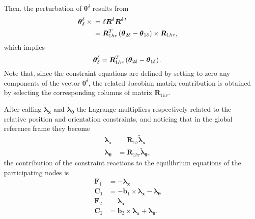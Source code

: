 \documentclass[10pt,dvips,fleqn]{report}
\newcommand{\T}[1]{\boldsymbol{#1}}
\begin{document}
Then, the perturbation of $\T{\theta}^{\delta}$ results from
\begin{align}
	\T{\theta}^{\delta}_{\delta} \times{}
	&= \delta\T{R}^{\delta} \T{R}^{\delta T} \\
	&= \T{R}_{1hr}^T \plbr{
		\T{\theta}_{2\delta} - \T{\theta}_{1\delta}
	} \times \T{R}_{1hr} ,
\end{align}
which implies
\begin{equation}
	\T{\theta}^{\delta}_{\delta} = \T{R}_{1hr}^T \plbr{
		\T{\theta}_{2\delta} - \T{\theta}_{1\delta}
	} .
\end{equation}
Note that, since the constraint equations are defined by setting 
to zero any components of the vector $\T{\theta}^{\delta}$, the
related Jacobian matrix contribution is obtained by selecting 
the corresponding columns of matrix $\T{R}_{1hr}$.


After calling $\tilde{\T{\lambda}}_{\T{x}}$
and $\tilde{\T{\lambda}}_{\T{\theta}}$ the Lagrange multipliers
respectively related to the relative position and orientation
constraints, and noticing that in the global reference frame
they become
\begin{align}
	\T{\lambda}_{\T{x}} &= \T{R}_{1h} \tilde{\T{\lambda}}_{\T{x}} \\
	\T{\lambda}_{\T{\theta}} &= \T{R}_{1hr} \tilde{\T{\lambda}}_{\T{\theta}} ,
\end{align}
the contribution of the constraint reactions to the equilibrium equations
of the participating nodes is
\begin{align}
	\T{F}_1 &= - \T{\lambda}_{\T{x}} \\
	\T{C}_1 &= - \T{b}_1 \times \T{\lambda}_{\T{x}} - \T{\lambda}_{\T{\theta}} \\
	\T{F}_2 &= \T{\lambda}_{\T{x}} \\
	\T{C}_2 &= \T{b}_2 \times \T{\lambda}_{\T{x}} + \T{\lambda}_{\T{\theta}} .
\end{align}
\end{document}
